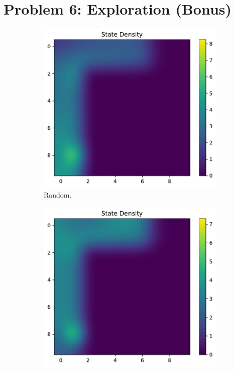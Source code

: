 \documentclass{article}
\begin{document}
\section{Problem 6: Exploration (Bonus)}
\begin{answer}[title=Plot,height=9.5cm,width=\linewidth]
    \begin{figure}[H]
        \centering
        \begin{subfigure}[b]{.45\linewidth}
            \centering
            \includegraphics[width=.99\linewidth]{figs/P6_easy_random_density.pdf}
            \caption{Random.}
        \end{subfigure}
        \begin{subfigure}[b]{.45\linewidth}
            \centering
            \includegraphics[width=.99\linewidth]{figs/P6_easy_rnd_density.pdf}

\end{subfigure}
\end{figure}
\end{answer}
\end{document}
